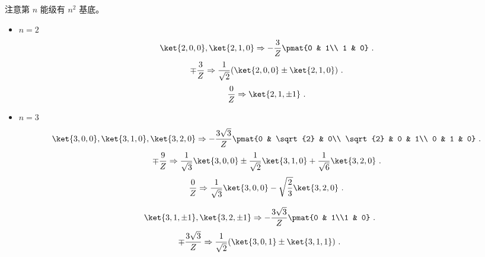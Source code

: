 注意第 $n$ 能级有 $n^2$ 基底。
\begin{itemize}
\item $n=2$
\begin{equation}
\ket{2,0,0},\ket{2,1,0} \Rightarrow-\frac{3}{Z}\pmat{0 & 1\\ 1 & 0}~.
\end{equation}
\begin{equation}
\mp\frac{3}{Z} \Rightarrow \frac{1}{\sqrt{2}}(\ket{2,0,0}\pm\ket{2,1,0})~.
\end{equation}
\begin{equation}
\frac{0}{Z} \Rightarrow \ket{2,1,\pm 1}~.
\end{equation}


\item $n=3$
\begin{equation}
\ket{3,0,0},\ket{3,1,0},\ket{3,2,0}\Rightarrow
-\frac{3\sqrt{3}}{Z}\pmat{0 & \sqrt{2} & 0\\ \sqrt{2} & 0 & 1\\ 0 & 1 & 0}~.
\end{equation}
\begin{equation}
\mp\frac{9}{Z} \Rightarrow \frac{1}{\sqrt{3}}\ket{3,0,0} \pm \frac{1}{\sqrt{2}}\ket{3,1,0} + \frac{1}{\sqrt{6}}\ket{3,2,0}~.
\end{equation}
\begin{equation}
\frac{0}{Z} \Rightarrow \frac{1}{\sqrt{3}}\ket{3,0,0} - \sqrt{\frac{2}{3}}\ket{3,2,0}~.
\end{equation}
\end{itemize}
\begin{equation}
\ket{3,1,\pm1},\ket{3,2,\pm1} \Rightarrow
-\frac{3\sqrt{3}}{Z}\pmat{0 & 1\\1 & 0}~.
\end{equation}
\begin{equation}
\mp\frac{3\sqrt{3}}{Z} \Rightarrow \frac{1}{\sqrt 2}(\ket{3,0,1}\pm\ket{3,1,1})~.
\end{equation}

